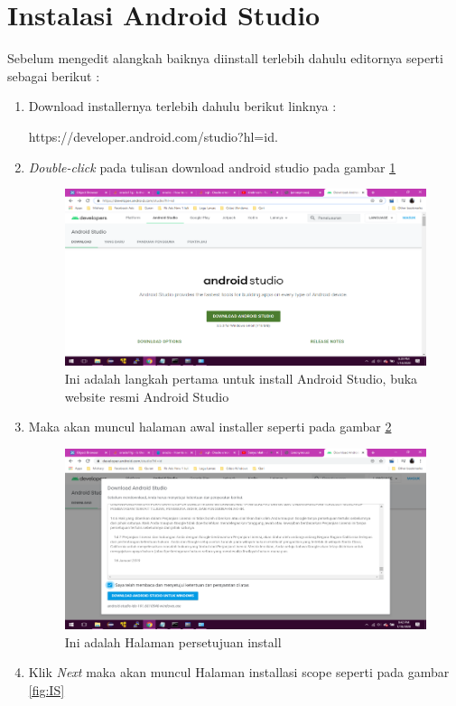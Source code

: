 \section{Instalasi Android Studio}
Sebelum mengedit alangkah baiknya diinstall terlebih dahulu editornya seperti sebagai berikut :
\begin{enumerate}
	\item Download installernya terlebih dahulu berikut linknya :
\par https://developer.android.com/studio?hl=id.
	\item \textit{Double-click} pada tulisan download android studio pada gambar \ref{fig:installer}
		 \begin{figure}[!htbp]
  		 \centering
 		 \includegraphics[width=.75\textwidth]{figures/In1.png}
  		 \caption{Ini adalah langkah pertama untuk install Android Studio, buka website resmi Android Studio}\label{fig:installer}
		 \end{figure}
	\item Maka akan muncul halaman awal installer seperti pada gambar  \ref{fig:agreement}
		 \begin{figure}[!htbp]
  		 \centering
 		 \includegraphics[width=.75\textwidth]{figures/In2.png}
  		 \caption{Ini adalah Halaman persetujuan install}\label{fig:agreement}
		 \end{figure}
	\item Klik \textit{Next} maka akan muncul Halaman installasi scope seperti pada gambar \ref{fig:IS}
		 \begin{figure}[!htbp]

\end{figure}
\end{enumerate}
